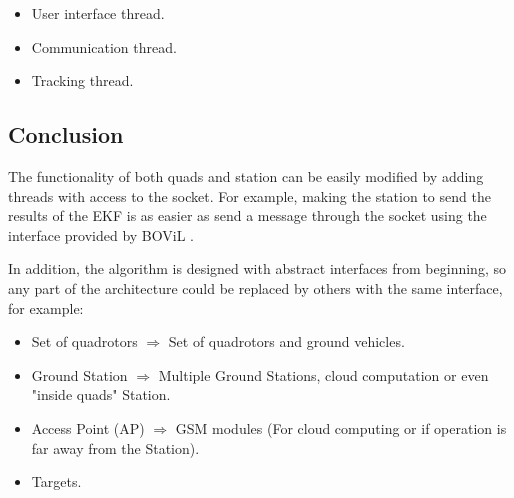 	
	\begin{itemize}
		\item User interface thread.
		\item Communication thread.
		\item Tracking thread.
	\end{itemize}
	
\subsection{Conclusion}
The functionality of both quads and station can be easily modified by adding threads with access to the socket. For example, making the station to send the results of the EKF is as easier as send a message through the socket using the interface provided by BOViL \cite{BOViL}. 

In addition, the algorithm is designed with abstract interfaces from beginning, so any part of the architecture could be replaced by others with the same interface, for example:

\begin{itemize}
  \item Set of quadrotors $\Longrightarrow$ Set of quadrotors and ground vehicles.
  \item Ground Station $\Longrightarrow$ Multiple Ground Stations, cloud computation \cite{Cloud_computing} or even "inside quads" Station.
  \item Access Point (AP) $\Longrightarrow$ GSM modules (For cloud computing or if operation is far away from the Station).
  \item Targets.
\end{itemize}


